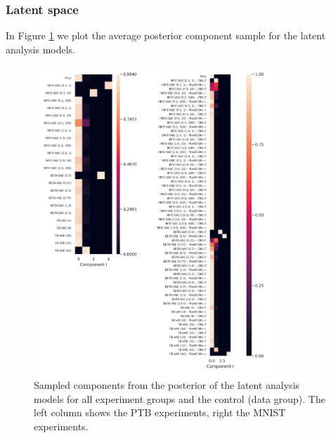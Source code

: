 



\subsubsection{Latent space}\label{app:latent-space}

In Figure \ref{fig:latent-component-plots} we plot the average posterior component sample for the latent analysis models.

\begin{figure}[!htb]
    \centering
    \includegraphics[width=0.8\textwidth]{images/latent-component-plots-06.png}
    \caption{Sampled components from the posterior of the latent analysis models for all experiment groups and the control (data group). The left column shows the PTB experiments, right the MNIST experiments.}
    \label{fig:latent-component-plots}
\end{figure}


